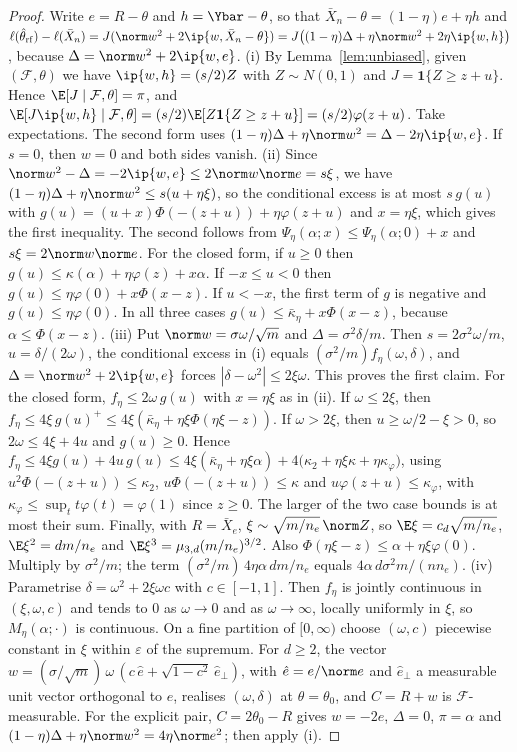 \begin{proof}
Write $e=R-\theta$ and $h=\Ybar-\theta$, so that $\bar X_n-\theta=(1-\eta)e+\eta h$ and $\ell(\hat\theta_{\rm rf})-\ell(\bar X_n)=J(\norm w^2+2\ip{w,\bar X_n-\theta})=J\big((1-\eta)\Delta+\eta\norm w^2+2\eta\ip{w,h}\big)$, because $\Delta=\norm w^2+2\ip{w,e}$.
(i) By Lemma~\ref{lem:unbiased}, given $(\mathcal F,\theta)$ we have $\ip{w,h}=(s/2)Z$ with $Z\sim N(0,1)$ and $J=\mathbf 1\{Z\ge z+u\}$. Hence $\E[J\mid\mathcal F,\theta]=\pi$, and $\E[J\ip{w,h}\mid\mathcal F,\theta]=(s/2)\E[Z\mathbf 1\{Z\ge z+u\}]=(s/2)\varphi(z+u)$. Take expectations. The second form uses $(1-\eta)\Delta+\eta\norm w^2=\Delta-2\eta\ip{w,e}$. If $s=0$, then $w=0$ and both sides vanish.
(ii) Since $\norm w^2-\Delta=-2\ip{w,e}\le2\norm w\norm e=s\xi$, we have $(1-\eta)\Delta+\eta\norm w^2\le s(u+\eta\xi)$, so the conditional excess is at most $s\,g(u)$ with $g(u)=(u+x)\Phi(-(z+u))+\eta\varphi(z+u)$ and $x=\eta\xi$, which gives the first inequality. The second follows from $\Psi_\eta(\alpha;x)\le\Psi_\eta(\alpha;0)+x$ and $s\xi=2\norm w\norm e$. For the closed form, if $u\ge0$ then $g(u)\le\kappa(\alpha)+\eta\varphi(z)+x\alpha$. If $-x\le u<0$ then $g(u)\le\eta\varphi(0)+x\Phi(x-z)$. If $u<-x$, the first term of $g$ is negative and $g(u)\le\eta\varphi(0)$. In all three cases $g(u)\le\bar\kappa_\eta+x\Phi(x-z)$, because $\alpha\le\Phi(x-z)$.
(iii) Put $\norm w=\sigma\omega/\sqrt m$ and $\Delta=\sigma^2\delta/m$. Then $s=2\sigma^2\omega/m$, $u=\delta/(2\omega)$, the conditional excess in (i) equals $(\sigma^2/m)f_\eta(\omega,\delta)$, and $\Delta=\norm w^2+2\ip{w,e}$ forces $|\delta-\omega^2|\le2\xi\omega$. This proves the first claim. For the closed form, $f_\eta\le2\omega\,g(u)$ with $x=\eta\xi$ as in (ii). If $\omega\le2\xi$, then $f_\eta\le4\xi\,g(u)^+\le4\xi(\bar\kappa_\eta+\eta\xi\Phi(\eta\xi-z))$. If $\omega>2\xi$, then $u\ge\omega/2-\xi>0$, so $2\omega\le4\xi+4u$ and $g(u)\ge0$. Hence $f_\eta\le4\xi g(u)+4u\,g(u)\le4\xi(\bar\kappa_\eta+\eta\xi\alpha)+4\big(\kappa_2+\eta\xi\kappa+\eta\kappa_\varphi\big)$, using $u^2\Phi(-(z+u))\le\kappa_2$, $u\Phi(-(z+u))\le\kappa$ and $u\varphi(z+u)\le\kappa_\varphi$, with $\kappa_\varphi\le\sup_t t\varphi(t)=\varphi(1)$ since $z\ge0$. The larger of the two case bounds is at most their sum. Finally, with $R=\bar X_e$, $\xi\sim\sqrt{m/n_e}\,\norm Z$, so $\E\xi=c_d\sqrt{m/n_e}$, $\E\xi^2=dm/n_e$ and $\E\xi^3=\mu_{3,d}(m/n_e)^{3/2}$. Also $\Phi(\eta\xi-z)\le\alpha+\eta\xi\varphi(0)$. Multiply by $\sigma^2/m$; the term $(\sigma^2/m)\,4\eta\alpha\,dm/n_e$ equals $4\alpha\,d\sigma^2m/(nn_e)$.
(iv) Parametrise $\delta=\omega^2+2\xi\omega c$ with $c\in[-1,1]$. Then $f_\eta$ is jointly continuous in $(\xi,\omega,c)$ and tends to $0$ as $\omega\to0$ and as $\omega\to\infty$, locally uniformly in $\xi$, so $M_\eta(\alpha;\cdot)$ is continuous. On a fine partition of $[0,\infty)$ choose $(\omega,c)$ piecewise constant in $\xi$ within $\varepsilon$ of the supremum. For $d\ge2$, the vector $w=(\sigma/\sqrt m)\,\omega\,(c\,\hat e+\sqrt{1-c^2}\,\hat e_\perp)$, with $\hat e=e/\norm e$ and $\hat e_\perp$ a measurable unit vector orthogonal to $e$, realises $(\omega,\delta)$ at $\theta=\theta_0$, and $C=R+w$ is $\mathcal F$-measurable. For the explicit pair, $C=2\theta_0-R$ gives $w=-2e$, $\Delta=0$, $\pi=\alpha$ and $(1-\eta)\Delta+\eta\norm w^2=4\eta\norm e^2$; then apply (i).

\end{proof}
